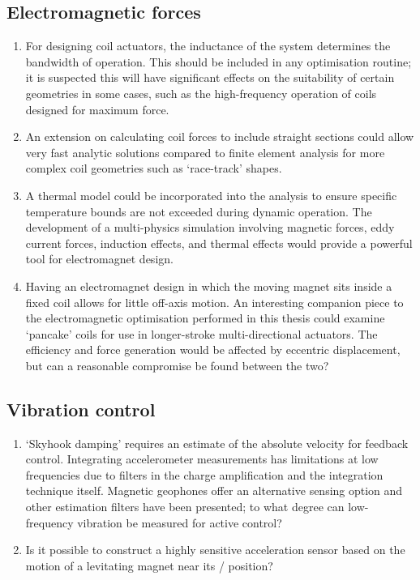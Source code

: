 \documentclass[10pt,a4paper]{memoir}
\begin{document}
\subsection{Electromagnetic forces}

\begin{enumerate}
\item For designing coil actuators, the inductance of the system determines the bandwidth of operation.
This should be included in any optimisation routine; it is suspected this will have significant effects on the suitability of certain geometries in some cases, such as the high-frequency operation of coils designed for maximum force.

\item An extension on calculating coil forces to include straight sections could allow very fast analytic solutions compared to finite element analysis for more complex coil geometries such as `race-track' shapes.

\item A thermal model could be incorporated into the analysis to ensure specific temperature bounds are not exceeded during dynamic operation.
The development of a multi-physics simulation involving magnetic forces, eddy current forces, induction effects, and thermal effects would provide a powerful tool for electromagnet design.

\item Having an electromagnet design in which the moving magnet sits inside a fixed coil allows for little off-axis motion.
An interesting companion piece to the electromagnetic optimisation performed in this thesis could examine `pancake' coils for use in longer-stroke multi-directional actuators.
The efficiency and force generation would be affected by eccentric displacement, but can a reasonable compromise be found between the two?
\end{enumerate}

\subsection{Vibration control}

\begin{enumerate}
\item
`Skyhook damping' requires an estimate of the absolute velocity for feedback control.
Integrating accelerometer measurements has limitations at low frequencies due to filters in the charge amplification and the integration technique itself.
Magnetic geophones offer an alternative sensing option and other estimation filters have been presented; to what degree can low-frequency vibration be measured for active control?

\item
Is it possible to construct a highly sensitive acceleration sensor based on the motion of a levitating magnet near its \qzs/ position?
\end{enumerate}
\end{document}
